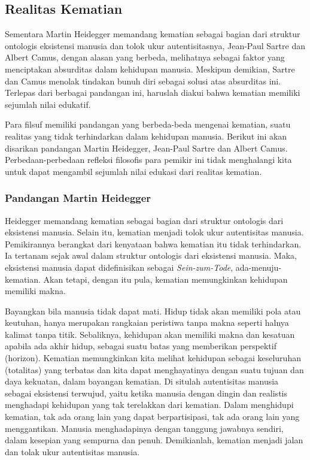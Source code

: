 \documentclass[10pt,a4paper]{article}
\renewenvironment{quote}
{\list{}{%
       \leftmargin 1.5em 
       \rightmargin 0em}
   \item\relax}
{\endlist}
\begin{document}
\begin{multicols}{2}
\hypertarget{realitas-kematian}{%
\subsection{Realitas Kematian}\label{realitas-kematian}}

\begin{quote}
Sementara Martin Heidegger memandang kematian sebagai bagian dari
struktur ontologis eksistensi manusia dan tolok ukur autentisitasnya,
Jean-Paul Sartre dan Albert Camus, dengan alasan yang berbeda,
melihatnya sebagai faktor yang menciptakan absurditas dalam kehidupan
manusia. Meskipun demikian, Sartre dan Camus menolak tindakan bunuh diri
sebagai solusi atas absurditas ini. Terlepas dari berbagai pandangan
ini, haruslah diakui bahwa kematian memiliki sejumlah nilai edukatif.
\end{quote}

Para filsuf memiliki pandangan yang berbeda-beda mengenai kematian,
suatu realitas yang tidak terhindarkan dalam kehidupan manusia. Berikut
ini akan disarikan pandangan Martin Heidegger, Jean-Paul Sartre dan
Albert Camus. Perbedaan-perbedaan refleksi filosofis para pemikir ini
tidak menghalangi kita untuk dapat mengambil sejumlah nilai edukasi dari
realitas kematian.

\hypertarget{pandangan-martin-heidegger-1}{%
\subsubsection{Pandangan Martin
Heidegger}\label{pandangan-martin-heidegger-1}}

Heidegger memandang kematian sebagai bagian dari struktur ontologis dari
eksistensi manusia. Selain itu, kematian menjadi tolok ukur autentisitas
manusia. Pemikirannya berangkat dari kenyataan bahwa kematian itu tidak
terhindarkan. Ia tertanam sejak awal dalam struktur ontologis dari
eksistensi manusia. Maka, eksistensi manusia dapat didefinisikan sebagai
\emph{Sein-zum-Tode}, ada-menuju-kematian. Akan tetapi, dengan itu pula,
kematian memungkinkan kehidupan memiliki makna.

Bayangkan bila manusia tidak dapat mati. Hidup tidak akan memiliki pola
atau keutuhan, hanya merupakan rangkaian peristiwa tanpa makna seperti
halnya kalimat tanpa titik. Sebaliknya, kehidupan akan memiliki makna
dan kesatuan apabila ada akhir hidup, sebagai suatu batas yang
memberikan perspektif (horizon). Kematian memungkinkan kita melihat
kehidupan sebagai keseluruhan (totalitas) yang terbatas dan kita dapat
menghayatinya dengan suatu tujuan dan daya kekuatan, dalam bayangan
kematian. Di situlah autentisitas manusia sebagai eksistensi terwujud,
yaitu ketika manusia dengan dingin dan realistis menghadapi kehidupan
yang tak terelakkan dari kematian. Dalam menghidupi kematian, tak ada
orang lain yang dapat berpartisipasi, tak ada orang lain yang
menggantikan. Manusia menghadapinya dengan tanggung jawabnya sendiri,
dalam kesepian yang sempurna dan penuh. Demikianlah, kematian menjadi
jalan dan tolak ukur autentisitas manusia.


\end{multicols}
\end{document}
